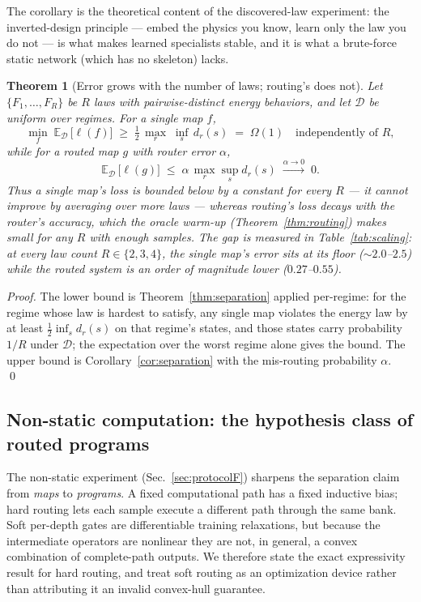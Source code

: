 \documentclass[11pt,a4paper]{article}
\newtheorem{theorem}{Theorem}
\begin{document}
The corollary is the theoretical content of the discovered-law experiment: the
inverted-design principle --- embed the physics you know, learn only the law
you do not --- is what makes learned specialists stable, and it is what a
brute-force static network (which has no skeleton) lacks.

\begin{theorem}[Error grows with the number of laws; routing's does not]
\label{thm:scaling}
Let $\{F_1,\dots,F_R\}$ be $R$ laws with pairwise-distinct energy behaviors, and
let $\mathcal{D}$ be uniform over regimes. For a single map $f$,
\[
  \min_f \; \mathbb{E}_{\mathcal{D}}\, \big[\ell(f)\big]
  \;\geq\; \tfrac{1}{2}\, \max_{r}\; \inf_{s}\, d_r(s)
  \;=\; \Omega(1) \quad \text{independently of } R,
\]
while for a routed map $g$ with router error $\alpha$,
\[
  \mathbb{E}_{\mathcal{D}}\, \big[\ell(g)\big]
  \;\leq\; \alpha\,\max_{r}\sup_{s} d_r(s) \;\xrightarrow{\alpha\to0}\; 0.
\]
Thus a single map's loss is bounded \emph{below} by a constant for every $R$ ---
it cannot improve by averaging over more laws --- whereas routing's loss decays
with the router's accuracy, which the oracle warm-up (Theorem~\ref{thm:routing})
makes small for any $R$ with enough samples. The gap is measured in
Table~\ref{tab:scaling}: at every law count $R\in\{2,3,4\}$, the single map's
error sits at its floor (${\sim}2.0$--$2.5$) while the routed system is an
order of magnitude lower ($0.27$--$0.55$).
\end{theorem}

\begin{proof}
The lower bound is Theorem~\ref{thm:separation} applied per-regime: for the
regime whose law is hardest to satisfy, any single map violates the energy law
by at least $\tfrac12\inf_s d_r(s)$ on that regime's states, and those states
carry probability $1/R$ under $\mathcal{D}$; the expectation over the worst
regime alone gives the bound. The upper bound is Corollary~\ref{cor:separation}
with the mis-routing probability $\alpha$. \qed
\end{proof}

\subsection{Non-static computation: the hypothesis class of routed programs}
\label{sec:theory-programs}

The non-static experiment (Sec.~\ref{sec:protocolF}) sharpens the separation
claim from \emph{maps} to \emph{programs}. A fixed computational path has a
fixed inductive bias; hard routing lets each sample execute a different path
through the same bank. Soft per-depth gates are differentiable training
relaxations, but because the intermediate operators are nonlinear they are not,
in general, a convex combination of complete-path outputs. We therefore state
the exact expressivity result for hard routing, and treat soft routing as an
optimization device rather than attributing it an invalid convex-hull guarantee.
\end{document}

